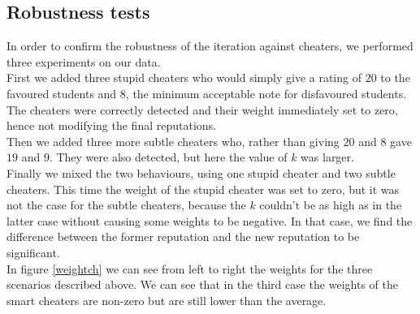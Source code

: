 \documentclass[12pt,a4paper]{article}
\begin{document}
\FloatBarrier

\subsection{Robustness tests}
In order to confirm the robustness of the iteration against cheaters, we performed three experiments on our data.\\
 First we added three stupid cheaters who would simply give a rating of $20$ to the favoured students and $8$, the minimum acceptable note for disfavoured students. The cheaters were correctly detected and their weight immediately set to zero, hence not modifying the final reputations.\\
 Then we added three more subtle cheaters who, rather than giving $20$ and $8$ gave $19$ and $9$. They were also detected, but here the value of $k$ was larger.\\
 Finally we mixed the two behaviours, using one stupid cheater and two subtle cheaters. This time the weight of the stupid cheater was set to zero, but it was not the case for the subtle cheaters, because the $k$ couldn't be as high as in the latter case without causing some weights to be negative. In that case, we find the difference between the former reputation and the new reputation to be significant.\\
 
In figure \ref{weightch} we can see from left to right the weights for the three scenarios described above. We can see that in the third case the weights of the smart cheaters are non-zero but are still lower than the average.
\end{document}
